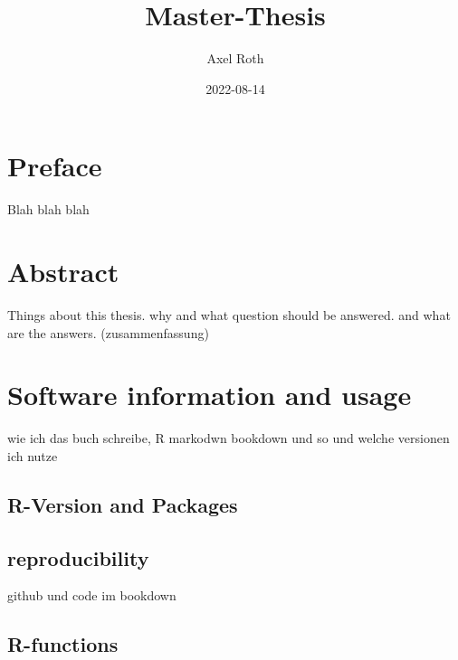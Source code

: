 \documentclass[
  oneside]{book}
\title{Master-Thesis}
\author{Axel Roth}
\date{2022-08-14}
\begin{document}
\maketitle

{
\setcounter{tocdepth}{1}
\tableofcontents
}
\hypertarget{preface}{%
\chapter*{Preface}\label{preface}}

\renewcommand{\chaptermark}[1]{\markboth{\uppercase{#1}}{\uppercase{#1}}}

Blah blah blah

\renewcommand{\chaptermark}[1]{\markboth{\uppercase{\thechapter. \ #1}}{}}

\hypertarget{abstract}{%
\chapter{Abstract}\label{abstract}}

Things about this thesis. why and what question should be answered. and what are the answers. (zusammenfassung)

\hypertarget{software-information-and-usage}{%
\chapter{Software information and usage}\label{software-information-and-usage}}

wie ich das buch schreibe, R markodwn bookdown und so und welche versionen ich nutze

\hypertarget{r-version-and-packages}{%
\section{R-Version and Packages}\label{r-version-and-packages}}

\hypertarget{reproducibility}{%
\section{reproducibility}\label{reproducibility}}

github und code im bookdown

\hypertarget{r-functions}{%
\section{R-functions}\label{r-functions}}
\end{document}
